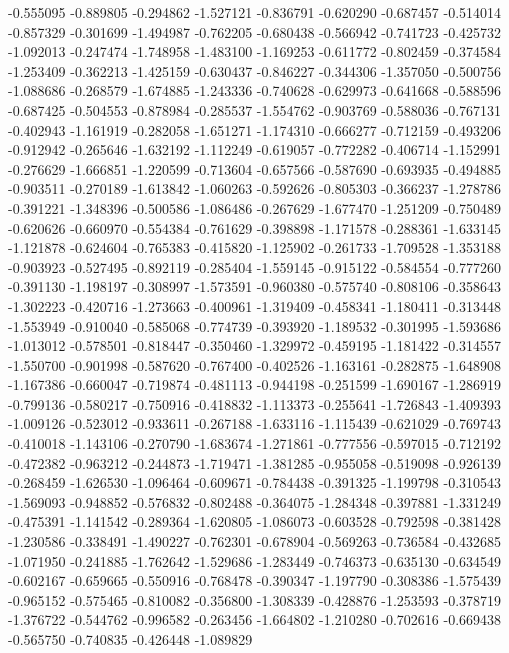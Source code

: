 -0.555095
-0.889805
-0.294862
-1.527121
-0.836791
-0.620290
-0.687457
-0.514014
-0.857329
-0.301699
-1.494987
-0.762205
-0.680438
-0.566942
-0.741723
-0.425732
-1.092013
-0.247474
-1.748958
-1.483100
-1.169253
-0.611772
-0.802459
-0.374584
-1.253409
-0.362213
-1.425159
-0.630437
-0.846227
-0.344306
-1.357050
-0.500756
-1.088686
-0.268579
-1.674885
-1.243336
-0.740628
-0.629973
-0.641668
-0.588596
-0.687425
-0.504553
-0.878984
-0.285537
-1.554762
-0.903769
-0.588036
-0.767131
-0.402943
-1.161919
-0.282058
-1.651271
-1.174310
-0.666277
-0.712159
-0.493206
-0.912942
-0.265646
-1.632192
-1.112249
-0.619057
-0.772282
-0.406714
-1.152991
-0.276629
-1.666851
-1.220599
-0.713604
-0.657566
-0.587690
-0.693935
-0.494885
-0.903511
-0.270189
-1.613842
-1.060263
-0.592626
-0.805303
-0.366237
-1.278786
-0.391221
-1.348396
-0.500586
-1.086486
-0.267629
-1.677470
-1.251209
-0.750489
-0.620626
-0.660970
-0.554384
-0.761629
-0.398898
-1.171578
-0.288361
-1.633145
-1.121878
-0.624604
-0.765383
-0.415820
-1.125902
-0.261733
-1.709528
-1.353188
-0.903923
-0.527495
-0.892119
-0.285404
-1.559145
-0.915122
-0.584554
-0.777260
-0.391130
-1.198197
-0.308997
-1.573591
-0.960380
-0.575740
-0.808106
-0.358643
-1.302223
-0.420716
-1.273663
-0.400961
-1.319409
-0.458341
-1.180411
-0.313448
-1.553949
-0.910040
-0.585068
-0.774739
-0.393920
-1.189532
-0.301995
-1.593686
-1.013012
-0.578501
-0.818447
-0.350460
-1.329972
-0.459195
-1.181422
-0.314557
-1.550700
-0.901998
-0.587620
-0.767400
-0.402526
-1.163161
-0.282875
-1.648908
-1.167386
-0.660047
-0.719874
-0.481113
-0.944198
-0.251599
-1.690167
-1.286919
-0.799136
-0.580217
-0.750916
-0.418832
-1.113373
-0.255641
-1.726843
-1.409393
-1.009126
-0.523012
-0.933611
-0.267188
-1.633116
-1.115439
-0.621029
-0.769743
-0.410018
-1.143106
-0.270790
-1.683674
-1.271861
-0.777556
-0.597015
-0.712192
-0.472382
-0.963212
-0.244873
-1.719471
-1.381285
-0.955058
-0.519098
-0.926139
-0.268459
-1.626530
-1.096464
-0.609671
-0.784438
-0.391325
-1.199798
-0.310543
-1.569093
-0.948852
-0.576832
-0.802488
-0.364075
-1.284348
-0.397881
-1.331249
-0.475391
-1.141542
-0.289364
-1.620805
-1.086073
-0.603528
-0.792598
-0.381428
-1.230586
-0.338491
-1.490227
-0.762301
-0.678904
-0.569263
-0.736584
-0.432685
-1.071950
-0.241885
-1.762642
-1.529686
-1.283449
-0.746373
-0.635130
-0.634549
-0.602167
-0.659665
-0.550916
-0.768478
-0.390347
-1.197790
-0.308386
-1.575439
-0.965152
-0.575465
-0.810082
-0.356800
-1.308339
-0.428876
-1.253593
-0.378719
-1.376722
-0.544762
-0.996582
-0.263456
-1.664802
-1.210280
-0.702616
-0.669438
-0.565750
-0.740835
-0.426448
-1.089829
